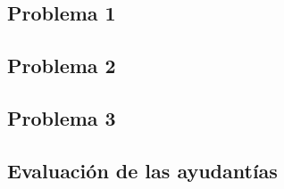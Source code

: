 \documentclass[12pt]{extarticle}
\begin{document}


\subsection*{Problema 1}


\newpage

\subsection*{Problema 2}


\subsection*{Problema 3}


\newpage

\subsection*{Evaluación de las ayudantías}

\end{document}
